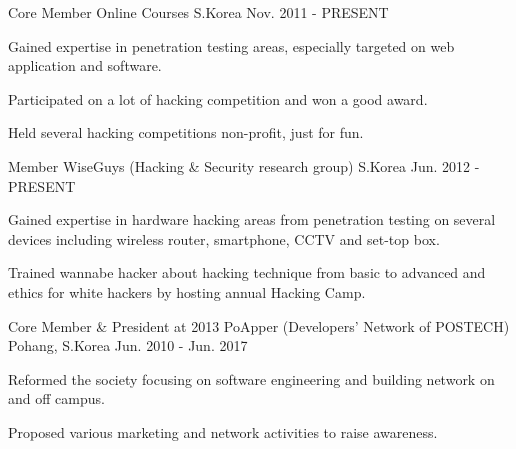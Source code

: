 

\begin{cventries}

  \cventry
    {Core Member} %
    {Online Courses} %
    {S.Korea} %
    {Nov. 2011 - PRESENT} %
    {
      \begin{cvitems} %
        \item {Gained expertise in penetration testing areas, especially targeted on web application and software.}
        \item {Participated on a lot of hacking competition and won a good award.}
        \item {Held several hacking competitions non-profit, just for fun.}
      \end{cvitems}
    }

  \cventry
    {Member} %
    {WiseGuys (Hacking \& Security research group)} %
    {S.Korea} %
    {Jun. 2012 - PRESENT} %
    {
      \begin{cvitems} %
        \item {Gained expertise in hardware hacking areas from penetration testing on several devices including wireless router, smartphone, CCTV and set-top box.}
        \item {Trained wannabe hacker about hacking technique from basic to advanced and ethics for white hackers by hosting annual Hacking Camp.}
      \end{cvitems}
    }

  \cventry
    {Core Member \& President at 2013} %
    {PoApper (Developers' Network of POSTECH)} %
    {Pohang, S.Korea} %
    {Jun. 2010 - Jun. 2017} %
    {
      \begin{cvitems} %
        \item {Reformed the society focusing on software engineering and building network on and off campus.}
        \item {Proposed various marketing and network activities to raise awareness.}
      \end{cvitems}
    }


\end{cventries}
